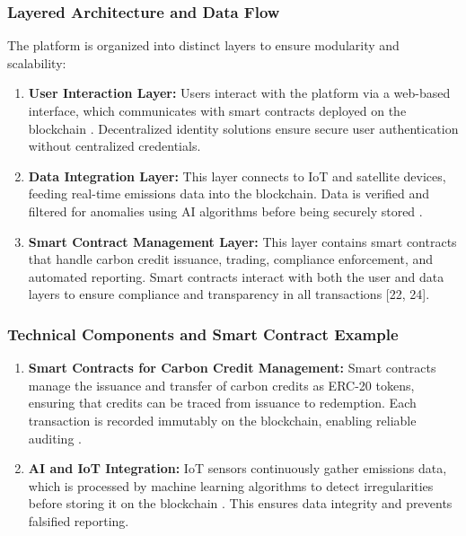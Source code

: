 \documentclass[preprint,12pt]{elsarticle}
\begin{document}
\subsubsection{Layered Architecture and Data Flow}
The platform is organized into distinct layers to ensure modularity and scalability:
\begin{enumerate}
    \item \textbf{User Interaction Layer:}
Users interact with the platform via a web-based interface, which communicates with smart contracts deployed on the blockchain \citep{buterin2014next}. Decentralized identity solutions ensure secure user authentication without centralized credentials.
    \item \textbf{Data Integration Layer:}
This layer connects to IoT and satellite devices, feeding real-time emissions data into the blockchain. Data is verified and filtered for anomalies using AI algorithms before being securely stored \citep{parikh2022smart}.
    \item \textbf{Smart Contract Management Layer:}
This layer contains smart contracts that handle carbon credit issuance, trading, compliance enforcement, and automated reporting. Smart contracts interact with both the user and data layers to ensure compliance and transparency in all transactions [22, 24].
\end{enumerate}
\subsubsection{Technical Components and Smart Contract Example}
\begin{enumerate}
    \item \textbf{Smart Contracts for Carbon Credit Management:}
Smart contracts manage the issuance and transfer of carbon credits as ERC-20 tokens, ensuring that credits can be traced from issuance to redemption. Each transaction is recorded immutably on the blockchain, enabling reliable auditing \citep{buterin2014next}.
    \item \textbf{AI and IoT Integration:}
IoT sensors continuously gather emissions data, which is processed by machine learning algorithms to detect irregularities before storing it on the blockchain \citep{parikh2022smart}. This ensures data integrity and prevents falsified reporting.
\end{enumerate}
\end{document}
